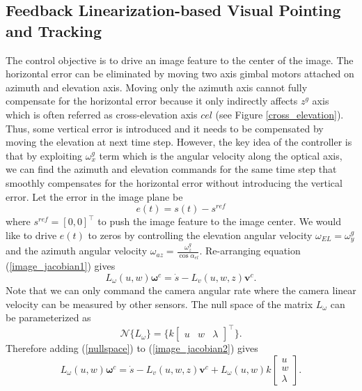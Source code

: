 \subsection{Feedback Linearization-based Visual Pointing and Tracking}
The control objective is to drive an image feature to the center of the image. The horizontal error can be eliminated by moving two axis gimbal motors attached on azimuth and elevation axis. Moving only the azimuth axis cannot fully compensate for the horizontal error because it only indirectly affects $z^g$ axis which is often referred as cross-elevation axis $cel$ (see Figure \ref{cross_elevation}). Thus, some vertical error is introduced and it needs to be compensated by moving the elevation at next time step. However, the key idea of the controller is that by exploiting $\omega_x^g$ term which is the angular velocity along the optical axis, we can find the azimuth and elevation commands for the same time step that smoothly compensates for the horizontal error without introducing the vertical error. Let the error in the image plane be
\begin{equation}
e(t)=s(t)-s^{ref}
\label{image_feature_error}
\end{equation}
where $s^{ref}=[0, 0]^\top$ to push the image feature to the image center. We would like to drive $e(t)$ to zeros by controlling the elevation angular velocity $\omega_{EL}=\omega_y^g$ and the azimuth angular velocity $\omega_{az}=\frac{\omega_z^g}{\cos \alpha_{el}}$. Re-arranging equation (\ref{image_jacobian1}) gives
\begin{equation}
L_{\omega}(u,w)\mathbf{\omega}^c=\dot{s}-L_v(u,w,z)\mathbf{v}^c.
\label{image_jacobian2}
\end{equation}
Note that we can only command the camera angular rate where the camera linear velocity can be measured by other sensors. The null space of the matrix $L_{\omega}$ can be parameterized as
\begin{equation}
\mathcal{N}\{L_{\omega}\}=\{k\begin{bmatrix}
u & w & \lambda
\end{bmatrix}^\top\}.
\label{nullspace}
\end{equation}
Therefore adding (\ref{nullspace}) to (\ref{image_jacobian2}) gives
\begin{equation}
L_{\omega}(u,w)\mathbf{\omega}^c=\dot{s}-L_v(u,w,z)\mathbf{v}^c+L_{\omega}(u,w)k\begin{bmatrix}
u \\ w \\ \lambda
\end{bmatrix}.
\label{image_jacobian3}
\end{equation}
